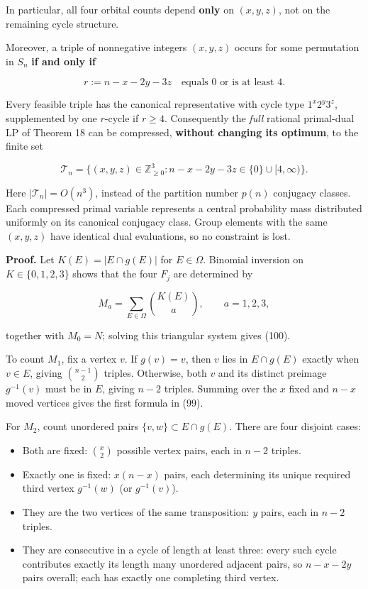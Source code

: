 \documentclass[
  11pt,
]{article}
\providecommand{\tightlist}{%
  \setlength{\itemsep}{0pt}\setlength{\parskip}{0pt}}
\begin{document}
In particular, all four orbital counts depend \textbf{only} on
\((x,y,z)\), not on the remaining cycle structure.

Moreover, a triple of nonnegative integers \((x,y,z)\) occurs for some
permutation in \(S_n\) \textbf{if and only if}

\[
r:=n-x-2y-3z\quad\text{equals \(0\) or is at least \(4\)}. \tag{101}
\]

Every feasible triple has the canonical representative with cycle type
\(1^x2^y3^z\), supplemented by one \(r\)-cycle if \(r\ge4\).
Consequently the \emph{full} rational primal-dual LP of Theorem 18 can
be compressed, \textbf{without changing its optimum}, to the finite set

\[
\mathcal T_n=
\{(x,y,z)\in\mathbb Z_{\ge0}^3:
n-x-2y-3z\in\{0\}\cup[4,\infty)\}. \tag{102}
\]

Here \(|\mathcal T_n|=O(n^3)\), instead of the partition number \(p(n)\)
conjugacy classes. Each compressed primal variable represents a central
probability mass distributed uniformly on its canonical conjugacy class.
Group elements with the same \((x,y,z)\) have identical dual
evaluations, so no constraint is lost.

\textbf{Proof.} Let \(K(E)=|E\cap g(E)|\) for \(E\in\Omega\). Binomial
inversion on \(K\in\{0,1,2,3\}\) shows that the four \(F_j\) are
determined by

\[
M_a=\sum_{E\in\Omega}\binom{K(E)}a,\qquad a=1,2,3,
\]

together with \(M_0=N\); solving this triangular system gives (100).

To count \(M_1\), fix a vertex \(v\). If \(g(v)=v\), then \(v\) lies in
\(E\cap g(E)\) exactly when \(v\in E\), giving \(\binom{n-1}{2}\)
triples. Otherwise, both \(v\) and its distinct preimage \(g^{-1}(v)\)
must be in \(E\), giving \(n-2\) triples. Summing over the \(x\) fixed
and \(n-x\) moved vertices gives the first formula in (99).

For \(M_2\), count unordered pairs \(\{v,w\}\subset E\cap g(E)\). There
are four disjoint cases:

\begin{itemize}
\tightlist
\item
  Both are fixed: \(\binom x2\) possible vertex pairs, each in \(n-2\)
  triples.
\item
  Exactly one is fixed: \(x(n-x)\) pairs, each determining its unique
  required third vertex \(g^{-1}(w)\) (or \(g^{-1}(v)\)).
\item
  They are the two vertices of the same transposition: \(y\) pairs, each
  in \(n-2\) triples.
\item
  They are consecutive in a cycle of length at least three: every such
  cycle contributes exactly its length many unordered adjacent pairs, so
  \(n-x-2y\) pairs overall; each has exactly one completing third
  vertex.
\end{itemize}
\end{document}
